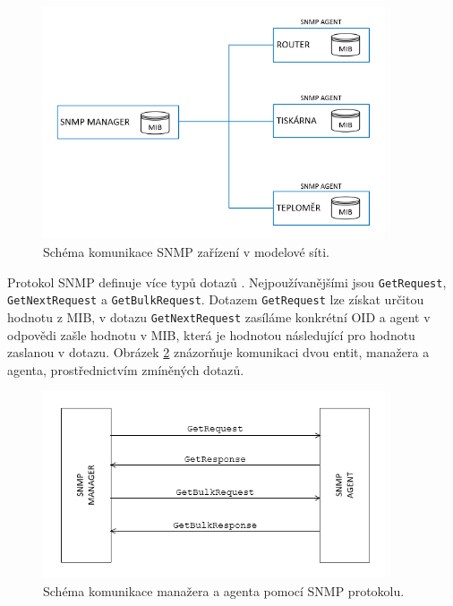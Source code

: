 \begin{figure}[!h]
	\begin{center}
		\includegraphics[width=0.9\textwidth]{obrazky/snmp_network_schema.png}
	\end{center}
	\caption{Schéma komunikace SNMP zařízení v modelové síti.}
	\label{fig:snmp-network-schema}
\end{figure}

Protokol SNMP definuje více typů dotazů \cite{Odom2009}. Nejpoužívanějšími jsou \texttt{GetRequest}, \texttt{GetNextRequest} a \texttt{GetBulkRequest}. Dotazem \texttt{GetRequest} lze získat určitou hodnotu z MIB, v dotazu \texttt{GetNextRequest} zasíláme konkrétní OID a agent v odpovědi zašle hodnotu v MIB, která je hodnotou následující pro hodnotu zaslanou v dotazu. Obrázek \ref{fig:snmp-protocol-schema} znázorňuje komunikaci dvou entit, manažera a agenta, prostřednictvím zmíněných dotazů.

\begin{figure}[!h]
	\begin{center}
		\includegraphics[width=0.9\textwidth]{obrazky/snmp_protocol_schema.png}
	\end{center}
	\caption{Schéma komunikace manažera a agenta pomocí SNMP protokolu.}
	\label{fig:snmp-protocol-schema}
\end{figure}

